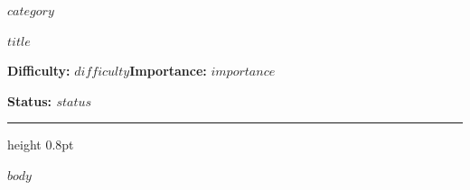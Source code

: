\documentclass[11pt,a4paper]{article}
\begin{document}
{\sffamily\small\color{muted}$category$\par}
\vspace{3pt}
{\raggedright{}\sffamily\bfseries\fontsize{21}{24}\selectfont\color{ink}$title$\par}
\vspace{7pt}
{\sffamily\small\textbf{Difficulty:} $difficulty$\quad\textbf{Importance:} $importance$\par}
{\sffamily\small\bfseries\color{accent}Status: $status$\par}
\vspace{4pt}
{\color{accent}\hrule height 0.8pt}
\vspace{6pt}
$body$
\end{document}
